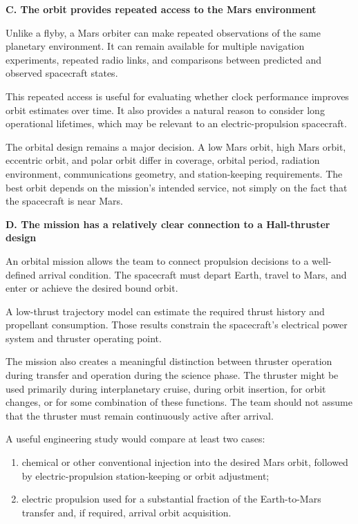 \textbf{C. The orbit provides repeated access to the Mars environment}

Unlike a flyby, a Mars orbiter can make repeated observations of
the same planetary environment. It can remain available for multiple
navigation experiments, repeated radio links, and comparisons
between predicted and observed spacecraft states.

This repeated access is useful for evaluating whether clock
performance improves orbit estimates over time. It also provides
a natural reason to consider long operational lifetimes, which may
be relevant to an electric-propulsion spacecraft.

The orbital design remains a major decision. A low Mars orbit,
high Mars orbit, eccentric orbit, and polar orbit differ in
coverage, orbital period, radiation environment, communications
geometry, and station-keeping requirements. The best orbit depends
on the mission's intended service, not simply on the fact that
the spacecraft is near Mars.

\textbf{D. The mission has a relatively clear connection to
	a Hall-thruster design}

An orbital mission allows the team to connect propulsion decisions
to a well-defined arrival condition. The spacecraft must depart
Earth, travel to Mars, and enter or achieve the desired bound orbit.

A low-thrust trajectory model can estimate the required thrust
history and propellant consumption. Those results constrain
the spacecraft's electrical power system and thruster operating
point.

The mission also creates a meaningful distinction between
thruster operation during transfer and operation during the
science phase. The thruster might be used primarily during
interplanetary cruise, during orbit insertion, for orbit changes,
or for some combination of these functions. The team should not
assume that the thruster must remain continuously active after
arrival.

A useful engineering study would compare at least two cases:

\begin{enumerate}
	\item chemical or other conventional injection into the
	      desired Mars orbit, followed by electric-propulsion
	      station-keeping or orbit adjustment;
	\item electric propulsion used for a substantial fraction
	      of the Earth-to-Mars transfer and, if required, arrival
	      orbit acquisition.
\end{enumerate}

